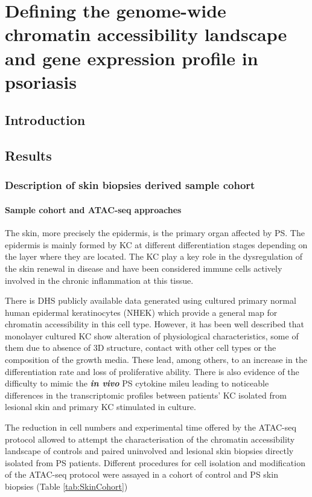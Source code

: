 \chapter{Defining the genome-wide chromatin accessibility landscape and gene expression profile in psoriasis}
\label{ch:Results 2}


\section{Introduction}
%

\section{Results}
%

\subsection*{Description of skin biopsies derived sample cohort}
\subsubsection{Sample cohort and ATAC-seq approaches}
The skin, more precisely the epidermis, is the primary organ affected by PS. The epidermis is mainly formed by KC at different differentiation stages depending on the layer where they are located.  The KC  play a key role in the dysregulation of the skin renewal in disease and have been considered immune cells actively involved in the chronic inflammation at this tissue.\par
There is DHS publicly available data generated using cultured primary normal human epidermal keratinocytes (NHEK) which provide a general map for chromatin accessibility in this cell type. However, it has been well described that monolayer cultured KC show alteration of physiological characteristics, some of them due to absence of 3D structure, contact with other cell types or the composition of the growth media. These lead, among others, to an increase in the differentiation rate and loss of proliferative ability. There is also evidence of the difficulty to mimic the \textbf{\textit{in vivo}} PS cytokine mileu leading to noticeable differences in the transcriptomic profiles between patients' KC isolated from lesional skin and primary KC stimulated in culture.\par The reduction in cell numbers and experimental time offered by the ATAC-seq protocol allowed to attempt the characterisation of the chromatin accessibility landscape of controls and paired uninvolved and lesional skin biopsies directly isolated from PS patients. Different procedures for cell isolation and modification of the ATAC-seq protocol were assayed in a cohort of control and PS skin biopsies (Table \ref{tab:SkinCohort}) 

